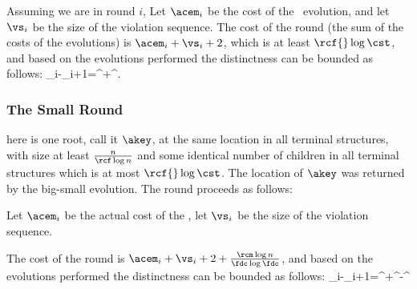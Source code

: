 Assuming we are in round $i$, Let $\acem_i$ be the cost of the \opEm\ evolution, and let $\vs_i$ be the size of the violation sequence.
The cost of the round (the sum of the costs of the evolutions) is $\acem_i + \vs_i+2$, which is at least ${\rcf {} \log \cst}$, and based on the evolutions performed the distinctness can be bounded as follows: 
\shortfull{$}{$$}\Distinct_i-\Distinct_{i+1}=^\opEm +^\eBs . \shortfull{$}{$$}






\subsubsection{The Small Round} 

here is one root, call it $\akey$, at the same location in all terminal structures, with size at least $\frac{n  }{\rcf   \log n}$ and some identical number of children in all terminal structures which is at most ${\rcf {} \log \cst}$. The location of $\akey$ was returned by the big-small evolution. The round proceeds as follows:
\begin{shortonly}
\end{shortonly}
\begin{fullonly}
\end{enumerate}
\end{fullonly}

Let $\acem_i$ be the actual cost of the \opEm,  let $\vs_i$ be the size of the violation sequence.
\begin{fullonly}

\end{fullonly}
The cost of the round is $\acem_i + \vs_i+2+\frac{\rcm \log n}{\fdc \log \fdc}$, and based on the evolutions performed the distinctness can be bounded as follows: 
\shortfull{$}{$$}\Distinct_i-\Distinct_{i+1}=^\opEm +^\eBs-^\ePerm\shortfull{$}{$$}






